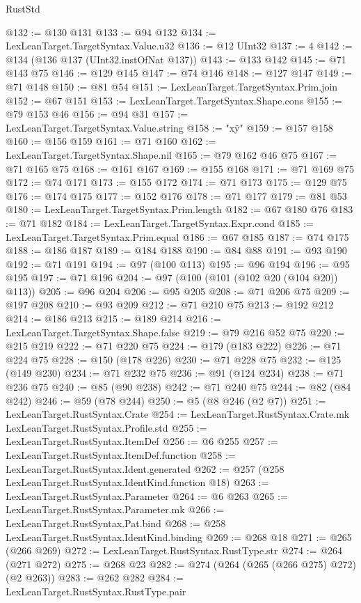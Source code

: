 \begin{lexlean}{RustStd}
\begin{coremodule}
@132 := @130 @131
@133 := @94 @132
@134 := LexLeanTarget.TargetSyntax.Value.u32
@136 := @12 UInt32
@137 := 4
@142 := @134 (@136 @137 (UInt32.instOfNat @137))
@143 := @133 @142
@145 := @71 @143 @75
@146 := @129 @145
@147 := @74 @146
@148 := @127 @147
@149 := @71 @148
@150 := @81 @54
@151 := LexLeanTarget.TargetSyntax.Prim.join
@152 := @67 @151
@153 := LexLeanTarget.TargetSyntax.Shape.cons
@155 := @79 @153 @46
@156 := @94 @31
@157 := LexLeanTarget.TargetSyntax.Value.string
@158 := "x\"y"
@159 := @157 @158
@160 := @156 @159
@161 := @71 @160
@162 := LexLeanTarget.TargetSyntax.Shape.nil
@165 := @79 @162 @46 @75
@167 := @71 @165 @75
@168 := @161 @167
@169 := @155 @168
@171 := @71 @169 @75
@172 := @74 @171
@173 := @155 @172
@174 := @71 @173
@175 := @129 @75
@176 := @174 @175
@177 := @152 @176
@178 := @71 @177
@179 := @81 @53
@180 := LexLeanTarget.TargetSyntax.Prim.length
@182 := @67 @180 @76
@183 := @71 @182
@184 := LexLeanTarget.TargetSyntax.Expr.cond
@185 := LexLeanTarget.TargetSyntax.Prim.equal
@186 := @67 @185
@187 := @74 @175
@188 := @186 @187
@189 := @184 @188
@190 := @84 @88
@191 := @93 @190
@192 := @71 @191
@194 := @97 (@100 @113)
@195 := @96 @194
@196 := @95 @195
@197 := @71 @196
@204 := @97 (@100 (@101 (@102 @20 (@104 @20)) @113))
@205 := @96 @204
@206 := @95 @205
@208 := @71 @206 @75
@209 := @197 @208
@210 := @93 @209
@212 := @71 @210 @75
@213 := @192 @212
@214 := @186 @213
@215 := @189 @214
@216 := LexLeanTarget.TargetSyntax.Shape.false
@219 := @79 @216 @52 @75
@220 := @215 @219
@222 := @71 @220 @75
@224 := @179 (@183 @222)
@226 := @71 @224 @75
@228 := @150 (@178 @226)
@230 := @71 @228 @75
@232 := @125 (@149 @230)
@234 := @71 @232 @75
@236 := @91 (@124 @234)
@238 := @71 @236 @75
@240 := @85 (@90 @238)
@242 := @71 @240 @75
@244 := @82 (@84 @242)
@246 := @59 (@78 @244)
@250 := @5 (@8 @246 (@2 @7))
@251 := LexLeanTarget.RustSyntax.Crate
@254 := LexLeanTarget.RustSyntax.Crate.mk LexLeanTarget.RustSyntax.Profile.std
@255 := LexLeanTarget.RustSyntax.ItemDef
@256 := @6 @255
@257 := LexLeanTarget.RustSyntax.ItemDef.function
@258 := LexLeanTarget.RustSyntax.Ident.generated
@262 := @257 (@258 LexLeanTarget.RustSyntax.IdentKind.function @18)
@263 := LexLeanTarget.RustSyntax.Parameter
@264 := @6 @263
@265 := LexLeanTarget.RustSyntax.Parameter.mk
@266 := LexLeanTarget.RustSyntax.Pat.bind
@268 := @258 LexLeanTarget.RustSyntax.IdentKind.binding
@269 := @268 @18
@271 := @265 (@266 @269)
@272 := LexLeanTarget.RustSyntax.RustType.str
@274 := @264 (@271 @272)
@275 := @268 @23
@282 := @274 (@264 (@265 (@266 @275) @272) (@2 @263))
@283 := @262 @282
@284 := LexLeanTarget.RustSyntax.RustType.pair

\end{coremodule}
\end{lexlean}
